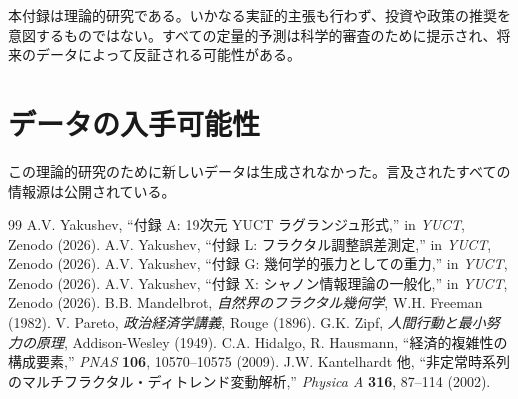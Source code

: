 \documentclass[12pt,a4paper]{article}
\theoremstyle{remark}
\begin{document}
	本付録は理論的研究である。いかなる実証的主張も行わず、投資や政策の推奨を意図するものではない。すべての定量的予測は科学的審査のために提示され、将来のデータによって反証される可能性がある。
	
	\section*{データの入手可能性}
	
	この理論的研究のために新しいデータは生成されなかった。言及されたすべての情報源は公開されている。
	
	\begin{thebibliography}{99}
		 A.V. Yakushev, ``付録 A: 19次元 YUCT ラグランジュ形式,'' in \emph{YUCT}, Zenodo (2026).
		 A.V. Yakushev, ``付録 L: フラクタル調整誤差測定,'' in \emph{YUCT}, Zenodo (2026).
		 A.V. Yakushev, ``付録 G: 幾何学的張力としての重力,'' in \emph{YUCT}, Zenodo (2026).
		 A.V. Yakushev, ``付録 X: シャノン情報理論の一般化,'' in \emph{YUCT}, Zenodo (2026).
		 B.B. Mandelbrot, \emph{自然界のフラクタル幾何学}, W.H. Freeman (1982).
		 V. Pareto, \emph{政治経済学講義}, Rouge (1896).
		 G.K. Zipf, \emph{人間行動と最小努力の原理}, Addison-Wesley (1949).
		 C.A. Hidalgo, R. Hausmann, ``経済的複雑性の構成要素,'' \emph{PNAS} \textbf{106}, 10570–10575 (2009).
		 J.W. Kantelhardt 他, ``非定常時系列のマルチフラクタル・ディトレンド変動解析,'' \emph{Physica A} \textbf{316}, 87–114 (2002).
	\end{thebibliography}
	
\end{document}
